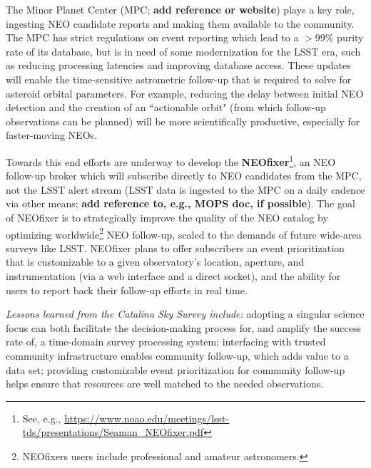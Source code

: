 The Minor Planet Center (MPC; {\bf add reference or website}) plays a key role, ingesting NEO candidate reports and making them available to the community. The MPC has strict regulations on event reporting which lead to a $>$99\% purity rate of its database, but is in need of some modernization for the LSST era, such as reducing processing latencies and improving database access. These updates will enable the time-sensitive astrometric follow-up that is required to solve for asteroid orbital parameters. For example, reducing the delay between initial NEO detection and the creation of an ``actionable orbit" (from which follow-up observations can be planned) will be more scientifically productive, especially for faster-moving NEOs.

Towards this end efforts are underway to develop the {\bf NEOfixer}\footnote{See, e.g., \url{https://www.noao.edu/meetings/lsst-tds/presentations/Seaman_NEOfixer.pdf}}, an NEO follow-up broker which will subscribe directly to NEO candidates from the MPC, not the LSST alert stream (LSST data is ingested to the MPC on a daily cadence via other means; {\bf add reference to, e.g., MOPS doc, if possible}). The goal of NEOfixer is to strategically improve the quality of the NEO catalog by optimizing worldwide\footnote{NEOfixers users include professional and amateur astronomers.} NEO follow-up, scaled to the demands of future wide-area surveys like LSST. NEOfixer plans to offer subscribers an event prioritization that is customizable to a given observatory's location, aperture, and instrumentation (via a web interface and a direct socket), and the ability for users to report back their follow-up efforts in real time.

{\it Lessons learned from the Catalina Sky Survey include:} adopting a singular science focus can both facilitate the decision-making process for, and amplify the success rate of, a time-domain survey processing system; interfacing with trusted community infrastructure enables community follow-up, which adds value to a data set; providing customizable event prioritization for community follow-up helps ensure that resources are well matched to the needed observations.


